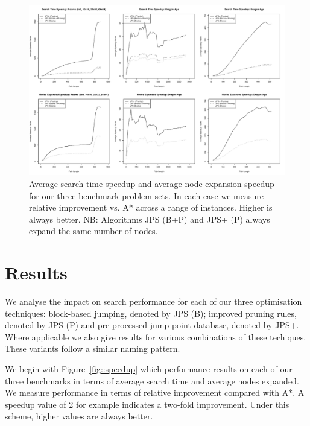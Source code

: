 \begin{figure}[tb]
       \begin{center}
		   \includegraphics[width=0.95\columnwidth, trim = 0mm 0mm 0mm 0mm]
			{diagrams/speedup.pdf}
       \end{center}
\caption{Average search time speedup and average node expansion speedup for our three benchmark problem sets. In each case we measure relative improvement vs. A* 
across a range of instances. Higher is always better. NB: Algorithms JPS (B+P) and JPS+ (P) always expand the same number of nodes. }
\label{fig::node_speedup}
\end{figure}

\section{Results}
\label{sec::results}

We analyse the impact on search performance for each of our three optimisation techniques:
block-based jumping, denoted by JPS (B); improved pruning rules, denoted by JPS (P) and 
pre-processed jump point database, denoted by JPS+.
Where applicable we also give results for various combinations of these techiques. These 
variants follow a similar naming pattern.

We begin with Figure~\ref{fig::speedup} which performance results on each of our three
benchmarks in terms of average search time and average nodes expanded. We measure performance
in terms of relative improvement compared with A*. A speedup value of 2 for example indicates 
a two-fold improvement. Under this scheme, higher values are always better.

